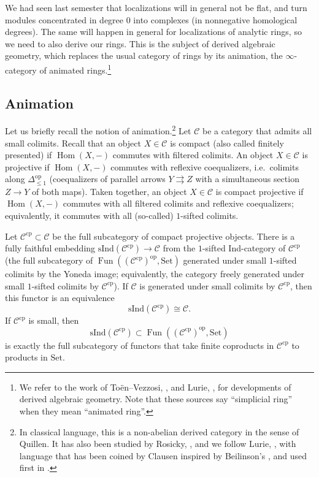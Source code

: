 \documentclass[11pt]{amsbook}
\DeclareMathOperator{\Hom}{Hom}
\DeclareMathOperator{\Fun}{Fun}
\numberwithin{equation}{section}
\numberwithin{theorem}{section}
\theoremstyle{definition}
\begin{document}
We had seen last semester that localizations will in general not be flat, and turn modules concentrated in degree $0$ into complexes (in nonnegative homological degrees). The same will happen in general for localizations of analytic rings, so we need to also derive our rings. This is the subject of derived algebraic geometry, which replaces the usual category of rings by its animation, the $\infty$-category of animated rings.\footnote{We refer to the work of To\"en--Vezzosi, \cite{ToenVezzosi}, and Lurie, \cite{LurieSAG}, for developments of derived algebraic geometry. Note that these sources say ``simplicial ring'' when they mean ``animated ring''.}

\subsection{Animation} Let us briefly recall the notion of animation.\footnote{In classical language, this is a non-abelian derived category in the sense of Quillen. It has also been studied by Rosicky, \cite{Rosicky}, and we follow Lurie, \cite[Section 5.5.8]{LurieHTT}, with language that has been coined by Clausen inspired by Beilinson's \cite{BeilinsonTopEpsilon}, and used first in \cite{CesnaviciusScholze}.} Let $\mathcal C$ be a category that admits all small colimits. Recall that an object $X\in \mathcal C$ is compact (also called finitely presented) if $\Hom(X,-)$ commutes with filtered colimits. An object $X\in\mathcal C$ is projective if $\Hom(X,-)$ commutes with reflexive coequalizers, i.e.~colimits along $\Delta_{\leq 1}^{\mathrm{op}}$ (coequalizers of parallel arrows $Y\rightrightarrows Z$ with a simultaneous section $Z\to Y$ of both maps). Taken together, an object $X\in\mathcal C$ is compact projective if $\Hom(X,-)$ commutes with all filtered colimits and reflexive coequalizers; equivalently, it commutes with all (so-called) $1$-sifted colimits.

Let $\mathcal C^{\mathrm{cp}}\subset \mathcal C$ be the full subcategory of compact projective objects. There is a fully faithful embedding $\mathrm{sInd}(\mathcal C^{\mathrm{cp}})\to \mathcal C$ from the $1$-sifted Ind-category of $\mathcal C^{\mathrm{cp}}$ (the full subcategory of $\Fun((\mathcal C^{\mathrm{cp}})^{\mathrm{op}},\mathrm{Set})$ generated under small $1$-sifted colimits by the Yoneda image; equivalently, the category freely generated under small $1$-sifted colimits by $\mathcal C^{\mathrm{cp}}$). If $\mathcal C$ is generated under small colimits by $\mathcal C^{\mathrm{cp}}$, then this functor is an equivalence
\[
\mathrm{sInd}(\mathcal C^{\mathrm{cp}})\cong \mathcal C.
\]
If $\mathcal C^{\mathrm{cp}}$ is small, then
\[
\mathrm{sInd}(\mathcal C^{\mathrm{cp}})\subset \Fun((\mathcal C^{\mathrm{cp}})^{\mathrm{op}},\mathrm{Set})
\]
is exactly the full subcategory of functors that take finite coproducts in $\mathcal C^{\mathrm{cp}}$ to products in $\mathrm{Set}$.
\end{document}
